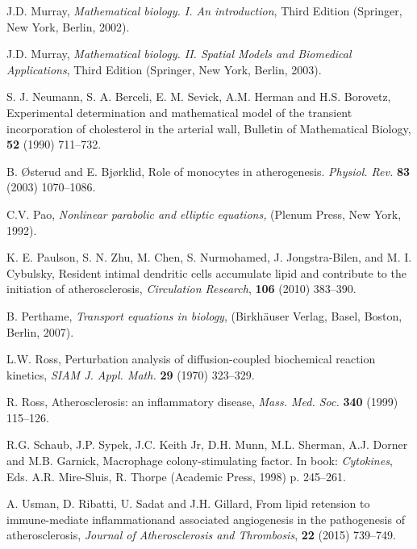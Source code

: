 \documentclass[reqno]{amsart}            %
\numberwithin{equation}{section}
\begin{document}
\begin{thebibliography}{99}
J.D. Murray, {\it Mathematical biology. I. An introduction}, Third Edition (Springer, New York, Berlin, 2002).

J.D. Murray, {\it Mathematical biology. II. Spatial Models and Biomedical Applications}, Third Edition (Springer, New York, Berlin, 2003).

S. J. Neumann, S. A. Berceli, E. M. Sevick, A.M. Herman and H.S. Borovetz, Experimental determination and mathematical model of the transient incorporation of cholesterol in the arterial wall, {Bulletin of Mathematical Biology}, {\bf 52} (1990) 711--732.


B. {\O}sterud and E. Bj{\o}rklid,  Role of monocytes in atherogenesis. {\it Physiol. Rev.} {\bf  83} (2003) 1070--1086.

C.V. Pao, {\it Nonlinear parabolic and elliptic equations,} (Plenum Press, New York, 1992).

K. E. Paulson, S. N. Zhu, M. Chen, S. Nurmohamed, J. Jongstra-Bilen, and M. I. Cybulsky, Resident intimal dendritic cells accumulate lipid and contribute to the initiation of atherosclerosis, {\it Circulation Research}, {\bf 106} (2010) 383--390.

B. Perthame, {\it Transport equations in biology}, (Birkh\"auser Verlag, Basel, Boston,  Berlin, 2007).

L.W. Ross, Perturbation analysis of diffusion-coupled biochemical reaction kinetics, {\it SIAM J. Appl. Math.} {\bf 29} (1970) 323--329.

R. Ross,  Atherosclerosis: an inflammatory disease, {\it Mass. Med. Soc.} {\bf 340} (1999) 115--126.

R.G. Schaub, J.P. Sypek, J.C. Keith Jr,  D.H. Munn, M.L. Sherman, A.J. Dorner and M.B. Garnick, Macrophage colony-stimulating factor. In book: {\it Cytokines}, Eds. A.R. Mire-Sluis, R. Thorpe
 (Academic Press, 1998) p. 245--261.

A. Usman, D. Ribatti, U. Sadat and J.H. Gillard, From lipid retension to immune-mediate inflammationand associated angiogenesis in the pathogenesis of atherosclerosis, {\it Journal of Atherosclerosis and Thrombosis}, {\bf 22} (2015) 739--749.
\end{thebibliography}
\end{document}
